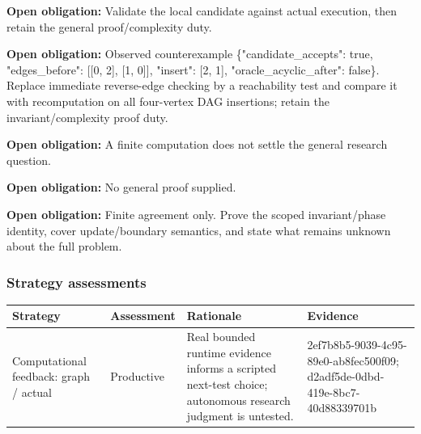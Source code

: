 \documentclass[11pt]{article}
\begin{document}
\textbf{Open obligation:} Validate the local candidate against actual execution, then retain the general proof/complexity duty.\par
\textbf{Open obligation:} Observed counterexample \{"candidate\_accepts": true, "edges\_before": [[0, 2], [1, 0]], "insert": [2, 1], "oracle\_acyclic\_after": false\}. Replace immediate reverse-edge checking by a reachability test and compare it with recomputation on all four-vertex DAG insertions; retain the invariant/complexity proof duty.\par
\textbf{Open obligation:} A finite computation does not settle the general research question.\par
\textbf{Open obligation:} No general proof supplied.\par
\textbf{Open obligation:} Finite agreement only. Prove the scoped invariant/phase identity, cover update/boundary semantics, and state what remains unknown about the full problem.\par
\subsubsection*{Strategy assessments}
\begin{longtable}{>{\raggedright\arraybackslash}p{.16\linewidth}>{\raggedright\arraybackslash}p{.15\linewidth}>{\raggedright\arraybackslash}p{.40\linewidth}>{\raggedright\arraybackslash}p{.17\linewidth}}
\toprule Strategy & Assessment & Rationale & Evidence \\
\midrule\endhead
Computational feedback: graph / actual & Productive & Real bounded runtime evidence informs a scripted next-test choice; autonomous research judgment is untested. & 2ef7b8b5-9039-4c95-89e0-ab8fec500f09; d2adf5de-0dbd-419e-8bc7-40d88339701b \\
\bottomrule
\end{longtable}
\end{document}
